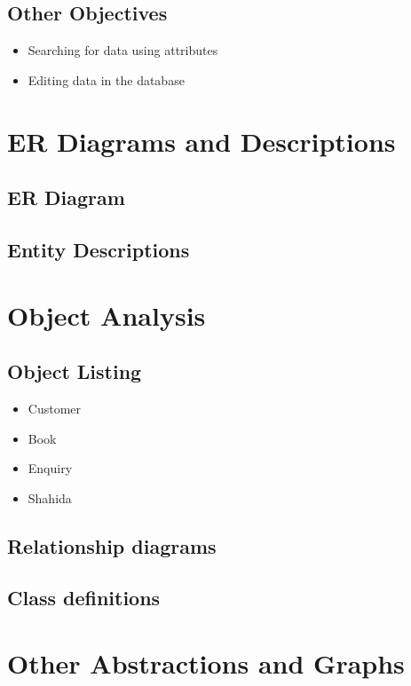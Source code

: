 \subsection{Other Objectives}

\begin{itemize}
    \item Searching for data using attributes
    \item Editing data in the database
\end{itemize}

\section{ER Diagrams and Descriptions}

\subsection{ER Diagram}
%

\subsection{Entity Descriptions}
%
\section{Object Analysis}

\subsection{Object Listing}

\begin{itemize}
    \item Customer
    \item Book
    \item Enquiry
    \item Shahida
\end{itemize}

\subsection{Relationship diagrams}
%
\subsection{Class definitions}
%
\section{Other Abstractions and Graphs}

